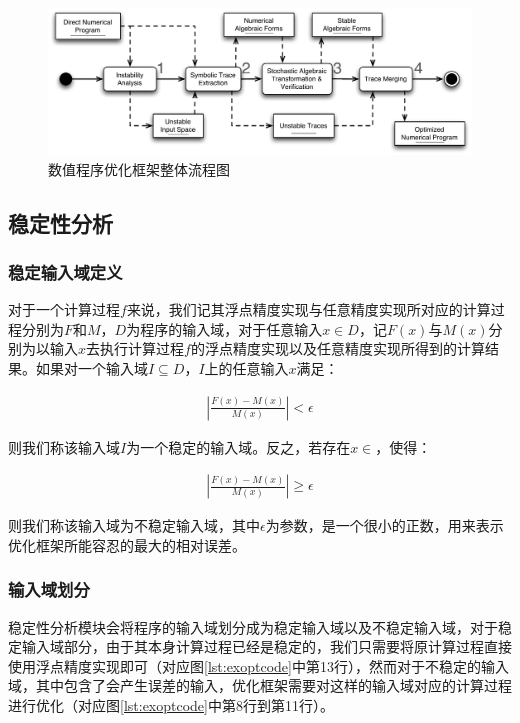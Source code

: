 \begin{figure}[thbp]
  \centering
 \includegraphics[width=\textwidth]{fig/MainFramework.pdf}
  \caption{数值程序优化框架整体流程图} \label{fig:mainframe}
\end{figure}

\subsection{稳定性分析}

\subsubsection{稳定输入域定义}
对于一个计算过程$f$来说，我们记其浮点精度实现与任意精度实现所对应的计算过程分别为$F$和$M$，$D$为程序的输入域，对于任意输入$x \in D$，记$F(x)$与$M(x)$分别为以输入$x$去执行计算过程$f$的浮点精度实现以及任意精度实现所得到的计算结果。如果对一个输入域$I \subseteq D$，$I$上的任意输入$x$满足：

\begin{align}
  |\frac{F(x)-M(x)}{M(x)}| < \epsilon
\end{align}

则我们称该输入域$I$为一个稳定的输入域。反之，若存在$x \in $，使得：

\begin{align}
  |\frac{F(x)-M(x)}{M(x)}| \geq \epsilon
\end{align}

则我们称该输入域为不稳定输入域，其中$\epsilon$为参数，是一个很小的正数，用来表示优化框架所能容忍的最大的相对误差。

\subsubsection{输入域划分}

稳定性分析模块会将程序的输入域划分成为稳定输入域以及不稳定输入域，对于稳定输入域部分，由于其本身计算过程已经是稳定的，我们只需要将原计算过程直接使用浮点精度实现即可（对应图\ref{lst:exoptcode}中第13行），然而对于不稳定的输入域，其中包含了会产生误差的输入，优化框架需要对这样的输入域对应的计算过程进行优化（对应图\ref{lst:exoptcode}中第8行到第11行）。

